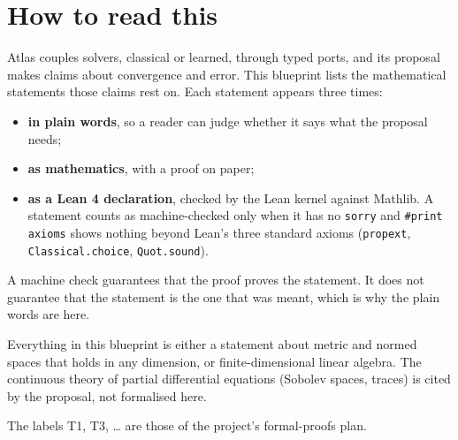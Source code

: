 
\chapter*{How to read this}

Atlas couples solvers, classical or learned, through typed ports, and its
proposal makes claims about convergence and error.  This blueprint lists the
mathematical statements those claims rest on.  Each statement appears three
times:

\begin{itemize}
  \item \textbf{in plain words}, so a reader can judge whether it says what
    the proposal needs;
  \item \textbf{as mathematics}, with a proof on paper;
  \item \textbf{as a Lean 4 declaration}, checked by the Lean kernel against
    Mathlib.  A statement counts as machine-checked only when it has no
    \texttt{sorry} and \texttt{\#print axioms} shows nothing beyond Lean's
    three standard axioms (\texttt{propext}, \texttt{Classical.choice},
    \texttt{Quot.sound}).
\end{itemize}

A machine check guarantees that the proof proves the statement.  It does not
guarantee that the statement is the one that was meant, which is why the plain
words are here.

Everything in this blueprint is either a statement about metric and normed
spaces that holds in any dimension, or finite-dimensional linear algebra.  The
continuous theory of partial differential equations (Sobolev spaces, traces) is
cited by the proposal, not formalised here.

The labels T1, T3, \dots{} are those of the project's formal-proofs plan.









